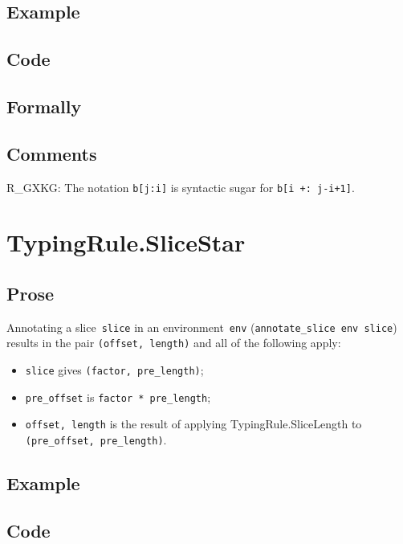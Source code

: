 \documentclass{book}
\begin{document}
  \subsection{Example}

  \subsection{Code}

\begin{emptyformal}
    \subsection{Formally}
\end{emptyformal}

\subsection{Comments}
    R\_GXKG: The notation \texttt{b[j:i]} is syntactic sugar for \texttt{b[i +: j-i+1]}.

\section{TypingRule.SliceStar \label{sec:TypingRule.SliceStar}}

  \subsection{Prose}
      Annotating a slice~\texttt{slice} in an environment~\texttt{env}
(\texttt{annotate\_slice env slice}) results in the pair \texttt{(offset,
length)} and all of the following apply:
   \begin{itemize}
   \item \texttt{slice} gives \texttt{(factor, pre\_length)};
   \item \texttt{pre\_offset} is \texttt{factor * pre\_length};
   \item \texttt{offset, length} is the result of applying TypingRule.SliceLength to \texttt{(pre\_offset, pre\_length)}.
   \end{itemize}

  \subsection{Example}

  \subsection{Code}
\end{document}

